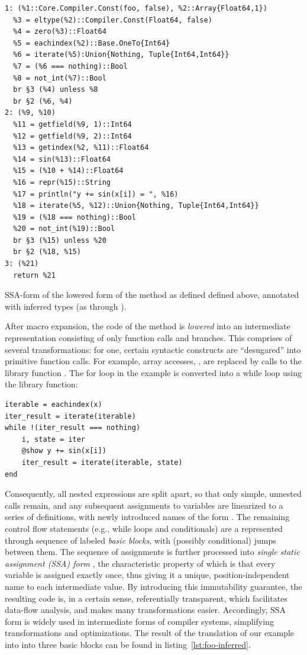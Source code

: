 \begin{lstfloat}[t]
\begin{lstlisting}[style=lstfloat]
1: (%1::Core.Compiler.Const(foo, false), %2::Array{Float64,1})
  %3 = eltype(%2)::Compiler.Const(Float64, false)
  %4 = zero(%3)::Float64
  %5 = eachindex(%2)::Base.OneTo{Int64}
  %6 = iterate(%5):Union{Nothing, Tuple{Int64,Int64}}
  %7 = (%6 === nothing)::Bool
  %8 = not_int(%7)::Bool
  br §3 (%4) unless %8
  br §2 (%6, %4)
2: (%9, %10)
  %11 = getfield(%9, 1)::Int64
  %12 = getfield(%9, 2)::Int64
  %13 = getindex(%2, %11)::Float64
  %14 = sin(%13)::Float64
  %15 = (%10 + %14)::Float64
  %16 = repr(%15)::String
  %17 = println("y += sin(x[i]) = ", %16)
  %18 = iterate(%5, %12)::Union{Nothing, Tuple{Int64,Int64}}
  %19 = (%18 === nothing)::Bool
  %20 = not_int(%19)::Bool
  br §3 (%15) unless %20
  br §2 (%18, %15)
3: (%21)
  return %21
\end{lstlisting}
  \caption{SSA-form of the lowered form of the method \protect{} as defined
    defined above, annotated with inferred types (as through
    \protect{}).\label{lst:foo-inferred}}
\end{lstfloat}

After macro expansion, the code of the method is \emph{lowered} into an intermediate
representation consisting of only function calls and branches.  This comprises of several
transformations: for one, certain syntactic constructs are \enquote{desugared} into primitive
function calls.  For example, array accesses, , are replaced by calls to the library
function .  The for loop in the example is converted into a while loop using
the  library function:
\begin{lstlisting}
iterable = eachindex(x)
iter_result = iterate(iterable)
while !(iter_result === nothing)
    i, state = iter
    @show y += sin(x[i])
    iter_result = iterate(iterable, state)
end
\end{lstlisting}
Consequently, all nested expressions are split apart, so that only simple, unnested calls remain,
and any subsequent assignments to variables are linearized to a series of definitions, with newly
introduced names of the form .  The remaining control flow statements (e.g., while loops
and conditionals) are a represented through sequence of labeled \emph{basic blocks}, with (possibly
conditional) jumps between them.  The sequence of assignments is further processed into \emph{single
  static assignment (SSA) form} \parencite{singer2018static}, the characteristic property of which
is that every variable is assigned exactly once, thus giving it a unique, position-independent name
to each intermediate value.  By introducing this immutability guarantee, the resulting code is, in a
certain sense, referentially transparent, which facilitates data-flow analysis, and makes many
transformations easier.  Accordingly, SSA form is widely used in intermediate forms of compiler
systems, simplifying transformations and optimizations.  The result of the translation of our
example into into three basic blocks can be found in listing~\ref{lst:foo-inferred}.

